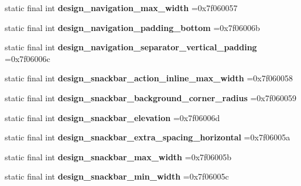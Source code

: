 \begin{DoxyCompactItemize}
static final int {\bfseries design\+\_\+navigation\+\_\+max\+\_\+width} =0x7f060057
\item 
\mbox{\label{classproject4_1_1xaria_1_1R_1_1dimen_a884a3a6c80c2557034ef3b734383b3ee}} 
static final int {\bfseries design\+\_\+navigation\+\_\+padding\+\_\+bottom} =0x7f06006b
\item 
\mbox{\label{classproject4_1_1xaria_1_1R_1_1dimen_ac034637130928c923d1af76bad4d3ab0}} 
static final int {\bfseries design\+\_\+navigation\+\_\+separator\+\_\+vertical\+\_\+padding} =0x7f06006c
\item 
\mbox{\label{classproject4_1_1xaria_1_1R_1_1dimen_a6df2ca406823c91a52005aa652557e48}} 
static final int {\bfseries design\+\_\+snackbar\+\_\+action\+\_\+inline\+\_\+max\+\_\+width} =0x7f060058
\item 
\mbox{\label{classproject4_1_1xaria_1_1R_1_1dimen_a996eb3af95119a3fbae42252aeffd560}} 
static final int {\bfseries design\+\_\+snackbar\+\_\+background\+\_\+corner\+\_\+radius} =0x7f060059
\item 
\mbox{\label{classproject4_1_1xaria_1_1R_1_1dimen_a7c90b18aab024be9df7f3e7c9ff2f71f}} 
static final int {\bfseries design\+\_\+snackbar\+\_\+elevation} =0x7f06006d
\item 
\mbox{\label{classproject4_1_1xaria_1_1R_1_1dimen_af87c0eedf92433a942cc2a52dddb2776}} 
static final int {\bfseries design\+\_\+snackbar\+\_\+extra\+\_\+spacing\+\_\+horizontal} =0x7f06005a
\item 
\mbox{\label{classproject4_1_1xaria_1_1R_1_1dimen_aad7efa44d16d275c745e117307938f90}} 
static final int {\bfseries design\+\_\+snackbar\+\_\+max\+\_\+width} =0x7f06005b
\item 
\mbox{\label{classproject4_1_1xaria_1_1R_1_1dimen_ac4d2caf37e4a7c4611312d029f8f5105}} 
static final int {\bfseries design\+\_\+snackbar\+\_\+min\+\_\+width} =0x7f06005c
\item 

\end{DoxyCompactItemize}

